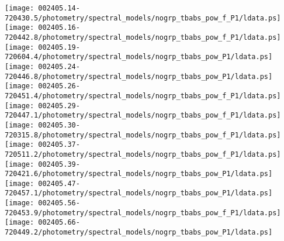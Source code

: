 \documentclass{aastex}
\begin{document}
\begin{figure*}[!ht]
\centering
\texttt{[image: 002405.14-720430.5/photometry/spectral\_models/nogrp\_tbabs\_pow\_f\_P1/ldata.ps]} \hfill 
\texttt{[image: 002405.16-720442.8/photometry/spectral\_models/nogrp\_tbabs\_pow\_f\_P1/ldata.ps]} \hfill 
\texttt{[image: 002405.19-720604.4/photometry/spectral\_models/nogrp\_tbabs\_pow\_P1/ldata.ps]} \\ 
\vspace*{0.5in}
\texttt{[image: 002405.24-720446.8/photometry/spectral\_models/nogrp\_tbabs\_pow\_P1/ldata.ps]} \hfill 
\texttt{[image: 002405.26-720451.4/photometry/spectral\_models/nogrp\_tbabs\_pow\_f\_P1/ldata.ps]} \hfill 
\texttt{[image: 002405.29-720447.1/photometry/spectral\_models/nogrp\_tbabs\_pow\_f\_P1/ldata.ps]} \\ 
\vspace*{0.5in}
\texttt{[image: 002405.30-720315.8/photometry/spectral\_models/nogrp\_tbabs\_pow\_f\_P1/ldata.ps]} \hfill 
\texttt{[image: 002405.37-720511.2/photometry/spectral\_models/nogrp\_tbabs\_pow\_f\_P1/ldata.ps]} \hfill 
\texttt{[image: 002405.39-720421.6/photometry/spectral\_models/nogrp\_tbabs\_pow\_P1/ldata.ps]} \\ 
\vspace*{0.5in}
\texttt{[image: 002405.47-720457.1/photometry/spectral\_models/nogrp\_tbabs\_pow\_P1/ldata.ps]} \hfill 
\texttt{[image: 002405.56-720453.9/photometry/spectral\_models/nogrp\_tbabs\_pow\_f\_P1/ldata.ps]} \hfill 
\texttt{[image: 002405.66-720449.2/photometry/spectral\_models/nogrp\_tbabs\_pow\_P1/ldata.ps]} \\ 
\vspace*{0.5in}
\end{figure*}
\clearpage
\end{document}
